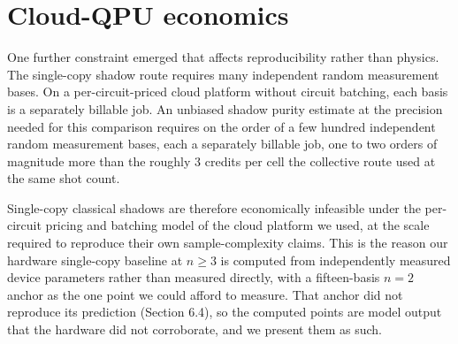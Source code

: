 \section{Cloud-QPU economics}\label{supp:economics}

One further constraint emerged that affects reproducibility rather than
physics. The single-copy shadow
route requires many independent random measurement bases. On a
per-circuit-priced cloud platform without circuit batching, each basis
is a separately billable job. An unbiased shadow purity estimate at the
precision needed for this comparison requires on the order of a few hundred
independent random measurement bases, each a separately billable job, one to
two orders of magnitude more than the roughly 3 credits per cell the collective
route used at the same shot count.

Single-copy classical shadows are therefore economically infeasible under
the per-circuit pricing and batching model of the cloud platform we used,
at the scale required to reproduce their
own sample-complexity claims. This is the reason our hardware
single-copy baseline at \(n \geq 3\) is computed from independently
measured device parameters rather than measured directly, with a
fifteen-basis \(n = 2\) anchor as the one point we could afford to
measure. That anchor did not reproduce its prediction (Section 6.4), so
the computed points are model output that the hardware did not
corroborate, and we present them as such.

